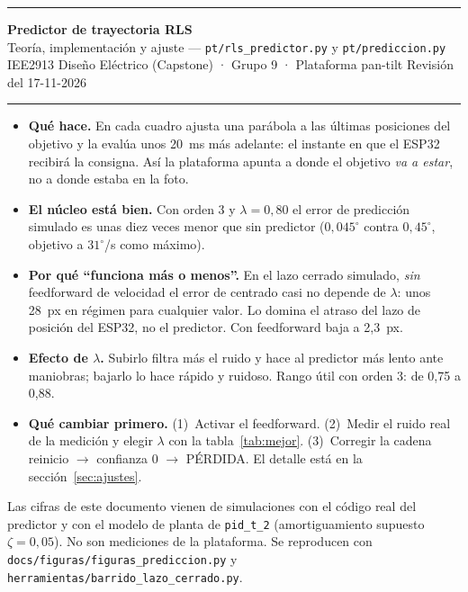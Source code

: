 \documentclass[11pt,a4paper]{article}
\newcommand{\cod}[1]{\texttt{#1}}
\newcommand{\lam}{\lambda}
\newcommand{\gr}{^{\circ}}
\begin{document}
{\color{azulosc}\rule{\linewidth}{1.4pt}}

\vspace{0.5em}
{\LARGE\bfseries Predictor de trayectoria RLS}\\[0.35em]
{\large Teoría, implementación y ajuste — \cod{pt/rls\_predictor.py} y \cod{pt/prediccion.py}}\\[0.5em]
{\small\color{tintados}IEE2913 Diseño Eléctrico (Capstone) · Grupo 9 · Plataforma pan-tilt \hfill Revisión del 17-11-2026}

\vspace{0.2em}
{\color{regla}\rule{\linewidth}{0.5pt}}

\begin{clave}[title={Lo esencial}]
\begin{itemize}[leftmargin=1.2em]
  \item \textbf{Qué hace.} En cada cuadro ajusta una parábola a las últimas posiciones del objetivo y la evalúa
        unos 20~ms más adelante: el instante en que el ESP32 recibirá la consigna. Así la plataforma apunta a
        donde el objetivo \emph{va a estar}, no a donde estaba en la foto.
  \item \textbf{El núcleo está bien.} Con orden 3 y $\lam = 0{,}80$ el error de predicción simulado es unas diez veces
        menor que sin predictor ($0{,}045\gr$ contra $0{,}45\gr$, objetivo a $31\gr$/s como máximo).
  \item \textbf{Por qué ``funciona más o menos''.} En el lazo cerrado simulado, \emph{sin} feedforward de velocidad
        el error de centrado casi no depende de $\lam$: unos 28~px en régimen para cualquier valor. Lo domina el
        atraso del lazo de posición del ESP32, no el predictor. Con feedforward baja a 2,3~px.
  \item \textbf{Efecto de $\lam$.} Subirlo filtra más el ruido y hace al predictor más lento ante maniobras;
        bajarlo lo hace rápido y ruidoso. Rango útil con orden 3: de 0,75 a 0,88.
  \item \textbf{Qué cambiar primero.} (1)~Activar el feedforward. (2)~Medir el ruido real de la medición y elegir
        $\lam$ con la tabla~\ref{tab:mejor}. (3)~Corregir la cadena reinicio $\rightarrow$ confianza 0
        $\rightarrow$ PÉRDIDA. El detalle está en la sección~\ref{sec:ajustes}.
\end{itemize}
\end{clave}

{\small\color{tintados}Las cifras de este documento vienen de simulaciones con el código real del predictor y con
el modelo de planta de \cod{pid\_t\_2} (amortiguamiento supuesto $\zeta = 0{,}05$). No son mediciones de la
plataforma. Se reproducen con \cod{docs/figuras/figuras\_prediccion.py} y
\cod{herramientas/barrido\_lazo\_cerrado.py}.}
\end{document}
